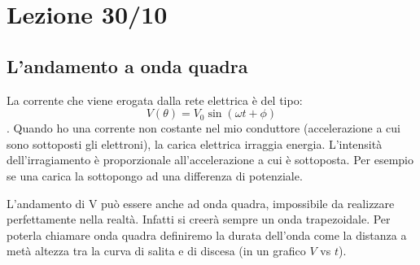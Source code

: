 \documentclass{article}
\begin{document}
\section{Lezione 30/10}
\subsection{L'andamento a onda quadra}
La corrente che viene erogata dalla rete elettrica è del tipo:\[ V(\theta)= V_0 \sin(\omega t + \phi)\].
Quando ho una corrente non costante nel mio conduttore (accelerazione a cui sono sottoposti gli elettroni),
la carica elettrica irraggia energia.
L'intensità dell'irragiamento è proporzionale all'accelerazione a cui è sottoposta. Per esempio se una carica la sottopongo ad una differenza di potenziale. 


\begin{figure}[h]
    \centering
\end{figure}

L'andamento di V può essere anche ad onda quadra, impossibile da realizzare perfettamente nella realtà. Infatti 
si creerà sempre un onda trapezoidale.
Per poterla chiamare onda quadra definiremo la durata dell'onda come la distanza a metà altezza tra la curva di salita e di discesa
(in un grafico $V$ vs $t$). 
\end{document}
